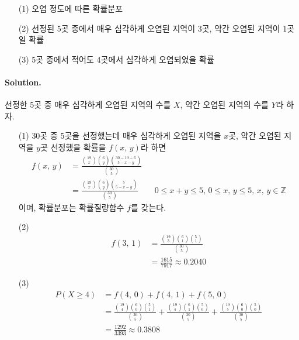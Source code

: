 \begin{itemize}
	\item [(1)] 오염 정도에 따른 확률분포
    \item [(2)] 선정된 5곳 중에서 매우 심각하게 오염된 지역이 3곳, 약간 오염된 지역이 1곳일 확률
    \item [(3)] 5곳 중에서 적어도 4곳에서 심각하게 오염되었을 확률
\end{itemize}

\paragraph{Solution.} 선정한 5곳 중 매우 심각하게 오염된 지역의 수를 $X$, 약간 오염된 지역의 수를 $Y$라 하자.
\begin{itemize}
	\item[(1)] {
        30곳 중 5곳을 선정했는데 매우 심각하게 오염된 지역을 $x$곳, 약간 오염된 지역을 $y$곳 선정했을 확률을 $f\left(x,\,y\right)$라 하면
	    \begin{align*}
            f\left(x,\,y\right) &= \frac{\displaystyle \binom{19}{x}\binom{6}{y}\binom{30-19-6}{5-x-y}}{\displaystyle\binom{30}{5}}\\
            &= \frac{\displaystyle \binom{19}{x}\binom{6}{y}\binom{5}{5-x-y}}{\displaystyle\binom{30}{5}} \qquad 0 \leq x + y \leq 5,\, 0 \leq x,\,y \leq 5,\,x,\,y\in \mathbb{Z}
	    \end{align*}
        이며, 확률분포는 확률질량함수 $f$를 갖는다.
    }
    \item[(2)] {
	    \begin{align*}
            f\left(3,\,1\right) &= \frac{\displaystyle \binom{19}{3}\binom{6}{1}\binom{5}{1}}{\displaystyle\binom{30}{5}}\\
            &= \frac{1615}{7917} \approx 0.2040
	    \end{align*}
    }
    \item[(3)] {
	    \begin{align*}
            P\left(X \geq 4\right) &= f\left(4,\,0\right) + f\left(4,\,1\right) + f\left(5,\,0\right)\\
            &=\frac{\displaystyle \binom{19}{4}\binom{6}{0}\binom{5}{1}}{\displaystyle\binom{30}{5}} +
            \frac{\displaystyle \binom{19}{4}\binom{6}{1}\binom{5}{0}}{\displaystyle\binom{30}{5}} +
            \frac{\displaystyle \binom{19}{5}\binom{6}{0}\binom{5}{0}}{\displaystyle\binom{30}{5}}\\
            &= \frac{1292}{3393} \approx 0.3808
        \end{align*}
    }
\end{itemize}